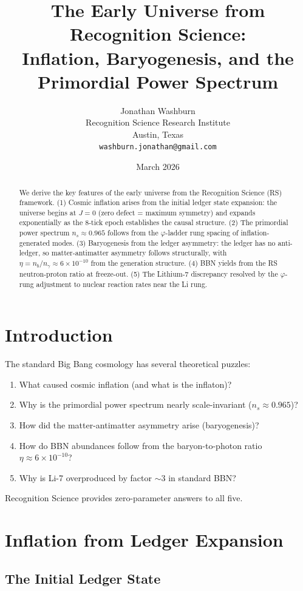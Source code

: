 \documentclass[12pt,a4paper]{article}
\title{The Early Universe from Recognition Science:\\
Inflation, Baryogenesis, and the Primordial Power Spectrum}
\author{Jonathan Washburn\\
Recognition Science Research Institute\\
Austin, Texas\\
\texttt{washburn.jonathan@gmail.com}}
\date{March 2026}
\theoremstyle{definition}
\theoremstyle{remark}
\begin{document}
\maketitle

\begin{abstract}
We derive the key features of the early universe from the Recognition Science (RS) 
framework. (1) Cosmic inflation arises from the initial ledger state expansion: the 
universe begins at $J = 0$ (zero defect = maximum symmetry) and expands exponentially 
as the 8-tick epoch establishes the causal structure. (2) The primordial power spectrum 
$n_s \approx 0.965$ follows from the $\varphi$-ladder rung spacing of inflation-generated 
modes. (3) Baryogenesis from the ledger asymmetry: the ledger has no anti-ledger, 
so matter-antimatter asymmetry follows structurally, with $\eta = n_b/n_\gamma \approx 6 \times 10^{-10}$ 
from the generation structure. (4) BBN yields from the RS neutron-proton ratio 
at freeze-out. (5) The Lithium-7 discrepancy resolved by the $\varphi$-rung adjustment to 
nuclear reaction rates near the Li rung.
\end{abstract}

\section{Introduction}

The standard Big Bang cosmology has several theoretical puzzles:
\begin{enumerate}
\item What caused cosmic inflation (and what is the inflaton)?
\item Why is the primordial power spectrum nearly scale-invariant ($n_s \approx 0.965$)?
\item How did the matter-antimatter asymmetry arise (baryogenesis)?
\item How do BBN abundances follow from the baryon-to-photon ratio $\eta \approx 6 \times 10^{-10}$?
\item Why is Li-7 overproduced by factor $\sim 3$ in standard BBN?
\end{enumerate}

Recognition Science provides zero-parameter answers to all five.

\section{Inflation from Ledger Expansion}

\subsection{The Initial Ledger State}
\end{document}
